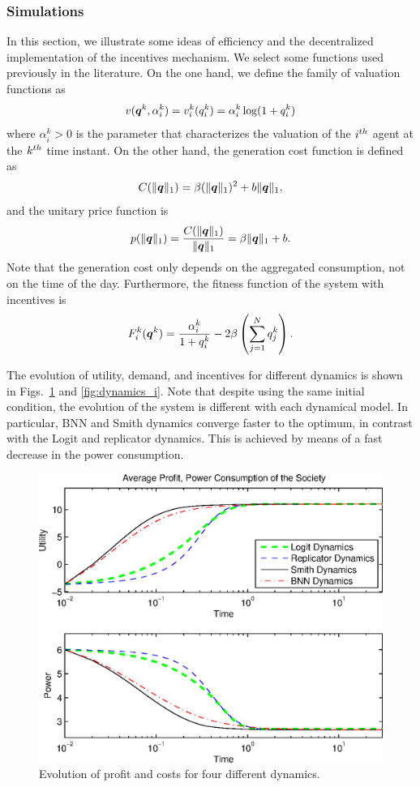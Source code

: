 \subsubsection{Simulations}

In this section, we illustrate some ideas of efficiency and the decentralized implementation of the incentives mechanism. We select some functions used previously in the literature. On the one hand, we define the family of valuation functions as 
\begin{equation}\label{eq:valuation_sim}
 v(\boldsymbol{q}^k,\alpha_i^k) = v_i^k (q_i^k) = \alpha_i^k \log(1+q_i^k)
\end{equation}
where $\alpha_i^k>0$ is the parameter that characterizes the valuation of the  $i^{th}$ agent at the $k^{th}$ time instant.
On the other hand, the generation cost function is defined as 
%
\begin{equation}\label{eq:cost_sim}
 C(\|\boldsymbol{q}\|_1) = \beta ({\|\boldsymbol{q}\|_1})^2 + b {\|\boldsymbol{q}\|_1},
\end{equation}
and the unitary price function is
%
\begin{equation}\label{eq:p_sim}
 p(\|\boldsymbol{q}\|_1) = \frac{C(\|\boldsymbol{q}\|_1)}{\|\boldsymbol{q}\|_1} = \beta \|\boldsymbol{q}\|_1 + b.
\end{equation}
%
Note that the generation cost only depends on the aggregated consumption, not on the time of the day. Furthermore, 
%
the fitness function of the system with incentives is
%
\begin{equation}\label{eq:fitness_without_i_sim}
F_i^k( \boldsymbol{q}^k)  =  \frac{\alpha_i^k }{1+q_i^k}
 - 2\beta \left( \sum_{j=1}^N q_j^k  \right).
 \end{equation}


The evolution of utility, demand, and incentives for different dynamics is shown in Figs.~\ref{fig:dynamics_u} and \ref{fig:dynamics_i}. Note that despite using the same initial condition, the evolution of the system is different with each dynamical model. In particular, BNN and Smith dynamics converge faster to the  optimum, in contrast with the Logit and replicator dynamics. 
This is achieved by means of a fast decrease in the power consumption. 

\begin{figure}[hbt]
 \centering
 \includegraphics[width=.75\textwidth]{./images/evolution_u.eps}
 \caption{Evolution of profit and costs for four different dynamics.}
 \label{fig:dynamics_u}
\end{figure}


